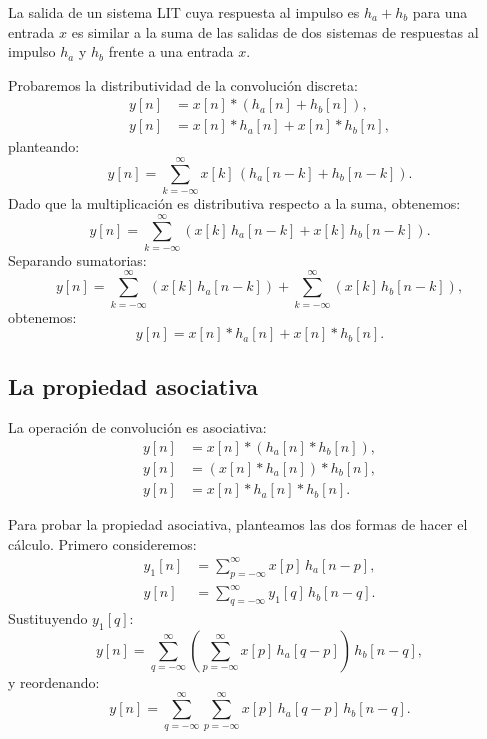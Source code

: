 \documentclass[11pt,a4paper,openany]{book}
\begin{document}
La salida de un sistema LIT cuya respuesta al impulso es $h_{a} + h_{b}$ para una entrada $x$ es similar a la suma de las salidas de dos sistemas de respuestas al impulso $h_{a}$ y $h_{b}$ frente a una entrada $x$.

Probaremos la distributividad de la convolución discreta:
\begin{align}
	y[n] &= x[n] * \left( h_{a}[n] + h_{b}[n] \right) , \\
	y[n] &= x[n] * h_{a}[n] + x[n] * h_{b}[n],
\end{align}
planteando:
\begin{equation}
	y[n] = \sum_{k=-\infty}^{\infty} x[k] \, \left( h_{a}[n-k] + h_{b}[n-k] \right).
\end{equation}
Dado que la multiplicación es distributiva respecto a la suma, obtenemos:
\begin{equation}
	y[n] = \sum_{k=-\infty}^{\infty} \left( x[k] \, h_{a}[n-k] + x[k] \, h_{b}[n-k] \right).
\end{equation}
Separando sumatorias:
\begin{equation}
	y[n] = \sum_{k=-\infty}^{\infty} \left( x[k] \, h_{a}[n-k] \right) + \sum_{k=-\infty}^{\infty} \left( x[k] \, h_{b}[n-k] \right) ,
\end{equation}
obtenemos:
\begin{equation}
	y[n] = x[n] * h_a[n] + x[n] * h_{b}[n] .
\end{equation}

\subsection{La propiedad asociativa}

La operación de convolución es asociativa:
\begin{align}
	y[n] &= x[n] * \left( h_a[n] * h_{b}[n] \right) , \\
	y[n] &= \left( x[n] * h_a[n] \right) * h_{b}[n] , \\
	y[n] &= x[n] * h_a[n] * h_{b}[n].
\end{align}

Para probar la propiedad asociativa, planteamos las dos formas de hacer el cálculo. Primero consideremos:
\begin{align}
	y_{1}[n] &= \sum_{p=-\infty}^{\infty} x[p] \, h_{a}[n-p], \\
	y[n] &= \sum_{q=-\infty}^{\infty} y_{1}[q] \, h_{b}[n-q].
\end{align}
Sustituyendo $y_1[q]$:
\begin{equation}
	y[n] = \sum_{q=-\infty}^{\infty} \left( \sum_{p=-\infty}^{\infty} x[p] \, h_{a}[q-p] \right) \, h_{b}[n-q],
\end{equation}
y reordenando:
\begin{equation}
	y[n] = \sum_{q=-\infty}^{\infty} \sum_{p=-\infty}^{\infty} x[p] \, h_{a}[q-p] \, h_{b}[n-q]. \label{eq:asoc1}
\end{equation}
\end{document}
